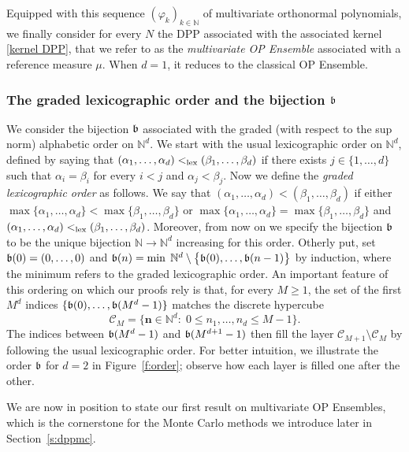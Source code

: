 \documentclass[a4paper,11pt]{article}
\numberwithin{equation}{section}
\theoremstyle{definition}
\newcommand{\rev}[1]{#1}
\newcommand{\eq}{\begin{equation}}
\newcommand{\qe}{\end{equation}}
\newcommand{\N}{\mathbb{N}}
\newcommand{\bs}{\boldsymbol}
\renewcommand{\leq}{\leqslant}
\renewcommand{\geq}{\geqslant}
\renewcommand{\phi}{\varphi}
\begin{document}
Equipped with this sequence $(\phi_k)_{k\in\N}$ of multivariate orthonormal
polynomials,  we finally consider for every $N$ the DPP associated with the
associated kernel \eqref{kernel DPP}, that we refer to as the \emph{multivariate OP
Ensemble} associated with a reference measure $\mu$. When $d=1$, it reduces to
the classical OP Ensemble.

\subsubsection{The graded lexicographic order and the bijection $\frak b$}
\label{graded lex order}
We consider the bijection $\frak b$ associated with the graded (with respect to
the sup norm) alphabetic order on $\N^d$. We start with the usual lexicographic
order on $\N^d$, defined by saying that $(\alpha_1,\ldots,\alpha_d)<_{{\rm
    lex}}(\beta_1,\ldots,\beta_d)$ if there exists $j\in\{1,\ldots,d\}$ such
that $\alpha_i=\beta_i$ for every $i<j$ and $\alpha_j<\beta_j$. Now we define
the \emph{graded lexicographic order} as follows. We say that $(\alpha_1,\ldots,\alpha_d)<(\beta_1,\ldots,\beta_d)$ if either $\max\{\alpha_1,\ldots,\alpha_d\}<\max\{\beta_1,\ldots,\beta_d\}$ or $
\max\{\alpha_1,\ldots,\alpha_d\}=\max\{\beta_1,\ldots,\beta_d\}$ and $ (\alpha_1,\ldots,\alpha_d)<_{{\rm lex}}(\beta_1,\ldots,\beta_d)$.
Moreover, from now on we specify the bijection $\frak b$ to be the unique
bijection $\N\to\N^d$ increasing for this order. Otherly put, set $\frak b(0)=(0,\ldots,0)$ and
$\frak b(n)=\min \;\N^d\setminus\big\{\frak b(0),\ldots, \frak b(n-1)\big\}$ by
induction, where the minimum refers to the graded lexicographic order. An
important feature of this ordering on which our proofs rely is that, for every $M\geq 1$, the set of the first $M^d$ indices $\{\frak b(0),\ldots,\frak b(M^d-1)\}$ matches the  discrete hypercube
\eq
\label{def CM}
\mathcal C_M= \Big\{\bs n\in\N^d :\; 0\leq n_1,\ldots, n_d\leq M-1\Big\}.
\qe
The indices between $\frak b(M^d-1)$ and $\frak b(M^{d+1}-1)$ then fill the layer $\mathcal C_{M+1}\setminus \mathcal C_M$ by following the usual lexicographic order. \rev{For better intuition, we illustrate the order $\frak b$ for $d=2$ in Figure~\ref{f:order}; observe how each layer is filled one after the other.}

We are now in position to state our first result on multivariate OP Ensembles,
which is the cornerstone for the Monte Carlo methods we introduce later in Section~\ref{s:dppmc}.
\end{document}

